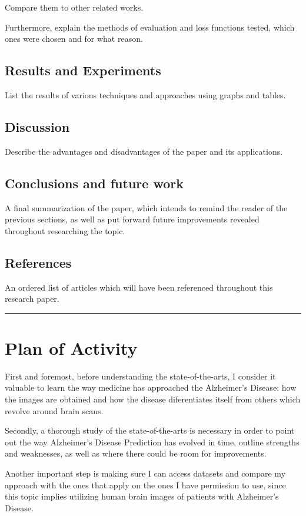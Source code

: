 \documentclass[a4paper]{article} %
\begin{document}
Compare them to other related works.

Furthermore, explain the methods of evaluation and loss functions tested, which ones were chosen and for what reason.

\subsection{Results and Experiments}
List the results of various techniques and approaches using graphs and tables.

\subsection{Discussion}
Describe the advantages and disadvantages of the paper and its applications.

\subsection{Conclusions and future work}
A final summarization of the paper, which intends to remind the reader of the previous sections,
as well as put forward future improvements revealed throughout researching the topic.

\subsection{References}
An ordered list of articles which will have been referenced throughout this research paper.

\vspace{14pt}
\hrule
\section{Plan of Activity}
First and foremost, before understanding the state-of-the-arts, I consider it valuable to learn the way medicine has approached
the Alzheimer's Disease: how the images are obtained and how the disease diferentiates itself from others which revolve around
brain scans.

Secondly, a thorough study of the state-of-the-arts is necessary in order to point out the way Alzheimer's Disease Prediction
has evolved in time, outline strengths and weaknesses, as well as where there could be room for improvements.

Another important step is making sure I can access datasets and compare my approach with the ones that apply on the ones I
have permission to use, since this topic implies utilizing human brain images of patients with Alzheimer's Disease.
\end{document}

